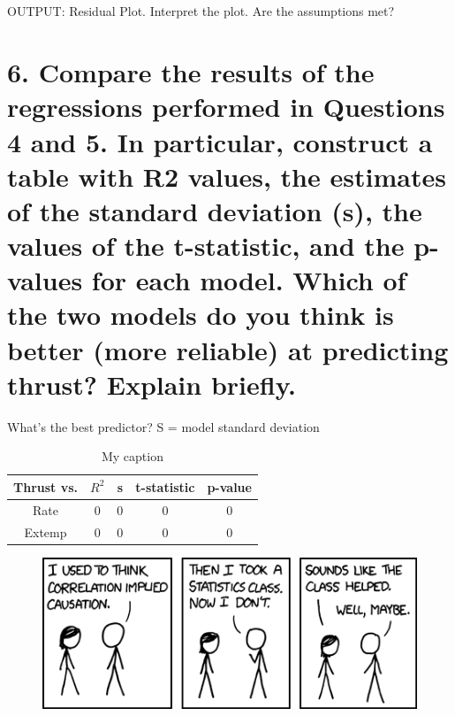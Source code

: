 \documentclass[letterpaper]{article}
\begin{document}
\setcounter{subsection}{6}
\subsection{}
OUTPUT: Residual Plot. Interpret the plot. Are the assumptions met?

\section{6.	Compare the results of the regressions performed in Questions 4 and 5. In particular, construct a table with R2 values, the estimates of the standard deviation (s), the values of the t-statistic, and the p-values for each model. Which of the two models do you think is better (more reliable) at predicting thrust? Explain briefly.}
What’s the best predictor? S = model standard deviation

\begin{table}[H]
 \centering
 \begin{tabular}{|c|c|c|c|c|}
  \hline
  Thrust vs. & $R^2$ & s & t-statistic & p-value \\ \hline
  Rate       & 0     & 0 & 0           & 0       \\ \hline
  Extemp     & 0     & 0 & 0           & 0       \\ \hline
 \end{tabular}
 \caption{My caption}
 \label{q6}
\end{table}


\newpage
\thispagestyle{empty}
\begin{figure}
 \centering
 \includegraphics[width=\textwidth]{correlation.png}
 \label{xkcd}
\end{figure}
\end{document}
